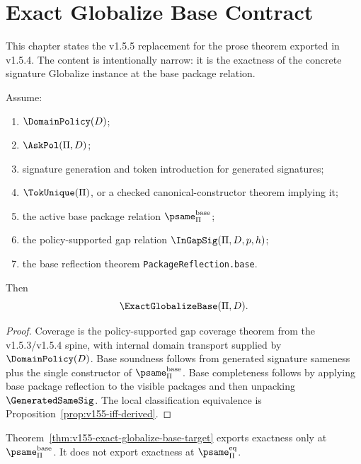\chapter{Exact Globalize Base Contract}
\label{ch:v155-exact-globalize-base-contract}

This chapter states the v1.5.5 replacement for the prose theorem exported in v1.5.4. The content is intentionally narrow: it is the exactness of the concrete signature Globalize instance at the base package relation.

\begin{theorem}
\label{thm:v155-exact-globalize-base-target}
Assume:
\begin{enumerate}
  \item \(\DomainPolicy(D)\);
  \item \(\AskPol(\Pi,D)\);
  \item signature generation and token introduction for generated signatures;
  \item \(\TokUnique(\Pi)\), or a checked canonical-constructor theorem implying it;
  \item the active base package relation \(\psame_{\Pi}^{\mathrm{base}}\);
  \item the policy-supported gap relation \(\InGapSig(\Pi,D,p,h)\);
  \item the base reflection theorem \texttt{PackageReflection.base}.
\end{enumerate}
Then
\[
  \ExactGlobalizeBase(\Pi,D).
\]
\end{theorem}

\begin{proof}
Coverage is the policy-supported gap coverage theorem from the v1.5.3/v1.5.4 spine, with internal domain transport supplied by \(\DomainPolicy(D)\). Base soundness follows from generated signature sameness plus the single constructor of \(\psame_{\Pi}^{\mathrm{base}}\). Base completeness follows by applying base package reflection to the visible packages and then unpacking \(\GeneratedSameSig\). The local classification equivalence is Proposition~\ref{prop:v155-iff-derived}.
\end{proof}

\begin{corollary}
\label{cor:v155-no-closure-export}
Theorem~\ref{thm:v155-exact-globalize-base-target} exports exactness only at \(\psame_{\Pi}^{\mathrm{base}}\). It does not export exactness at \(\psame_{\Pi}^{\mathrm{eq}}\).
\end{corollary}

